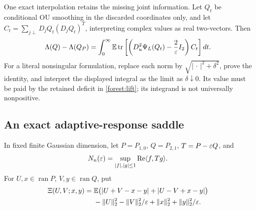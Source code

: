 One exact interpolation retains the missing joint information.
Let \(Q_t\) be conditional OU smoothing in the discarded coordinates
only, and let \(C_t=\sum_{j\perp}D_jQ_t(D_jQ_t)^T\), interpreting
complex values as real two-vectors. Then
\[
\Lambda(Q)-\Lambda(Q_P)
=\int_0^\infty\mathbb E\operatorname{tr}\left[
\left(D_u^2\Psi_L(Q_t)-\frac2{\varepsilon} I_2\right)C_t\right]dt.
\]
For a literal nonsingular formulation, replace each norm by
\(\sqrt{|\,\cdot\,|^2+\delta^2}\), prove the identity, and interpret
the displayed integral as the limit as \(\delta\downarrow0\).
Its value must be paid by the retained deficit in
\eqref{forest:lift}; its integrand is not universally nonpositive.

\subsection{An exact adaptive-response saddle}
\label{forest:saddle}

In fixed finite Gaussian dimension, let \(P=P_{1,0}\), \(Q=P_{2,1}\),
\(T=P-\varepsilon Q\), and
\[
N_n(\varepsilon)=\sup_{|f|,|g|\le1}\operatorname{Re}\langle f,Tg\rangle.
\]
For \(U,x\in\operatorname{ran}P\), \(V,y\in\operatorname{ran}Q\), put
\begin{align*}
\Xi(U,V;x,y)
={}&\mathbb E\bigl(|U+V-x-y|+|U-V+x-y|\bigr)\\
 &-\|U\|_2^2-\|V\|_2^2/\varepsilon
   +\|x\|_2^2+\|y\|_2^2/\varepsilon .
\end{align*}

